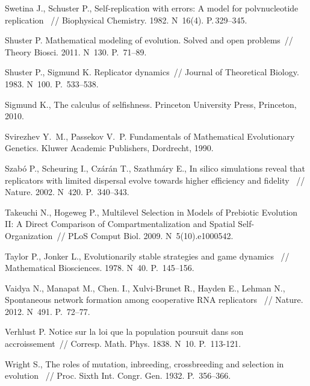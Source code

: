 \begin{thebibliography}{99}
 Swetina J., Schuster P.\:,  Self-replication with errors: A model for polvnucleotide replication ~// Biophysical Chemistry. 1982. N~16(4). P.\,329--345.

 Shuster P.\: Mathematical modeling of evolution. Solved and open problems~// Theory Biosci. 2011. N~130. P.\, 71--89. 

 Shuster P., Sigmund K.\: Replicator dynamics~// Journal of Theoretical Biology. 1983. N~100. P.\, 533--538.

 Sigmund K.\:, The calculus of selfishness. Princeton University Press, Princeton, 2010.

 Svirezhev Y.~M., Passekov V.~P.\: Fundamentals of Mathematical Evolutionary Genetics. Kluwer Academic Publishers, Dordrecht, 1990.

 Szab{\'o} P., Scheuring I., Cz{\'a}r{\'a}n T., Szathm{\'a}ry E.\:, In silico simulations reveal that replicators with limited dispersal evolve towards higher efficiency and fidelity ~// Nature. 2002. N~420. P.\, 340--343. 

 Takeuchi N., Hogeweg P.\:, Multilevel Selection in Models of Prebiotic Evolution II: A Direct Comparison of Compartmentalization and Spatial Self-Organization~// PLoS Comput Biol. 2009. N~5(10).e1000542.

 Taylor P., Jonker L.\:, Evolutionarily stable strategies and game dynamics ~// Mathematical Biosciences. 1978. N~40. P.\, 145--156.

 Vaidya N., Manapat M., Chen. I., Xulvi-Brunet R., Hayden E., Lehman N.\:, Spontaneous network formation among cooperative RNA replicators ~// Nature. 2012. N~491. P.\, 72--77.

 Verhlust P.\: Notice sur la loi que la population poursuit dans son accroissement~// Corresp. Math. Phys. 1838. N~10. P.\, 113-121.

 Wright S.\:, The roles of mutation, inbreeding, crossbreeding and selection in evolution ~// Proc. Sixth Int. Congr. Gen. 1932. P.\, 356--366.

\end{thebibliography}